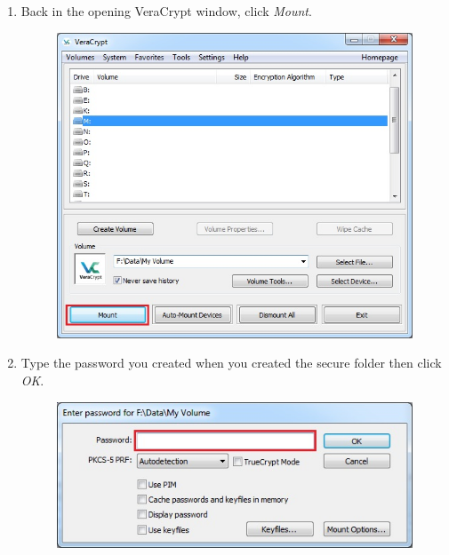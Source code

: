 \documentclass{tufte-handout}
\begin{document}
\begin{enumerate}
	\item Back in the opening VeraCrypt window, click \textit{Mount}.
	\begin{figure}%
		\includegraphics[width=.85\linewidth]{img/vc_mount_4.png}
	\end{figure}
	\FloatBarrier
	
	\newpage
	
	\item Type the password you created when you created the secure folder then click \textit{OK}.
	\begin{figure}%
		\includegraphics[width=\linewidth]{img/vc_mount_5.png}
	\end{figure}
	\FloatBarrier
	

\end{enumerate}
\end{document}
